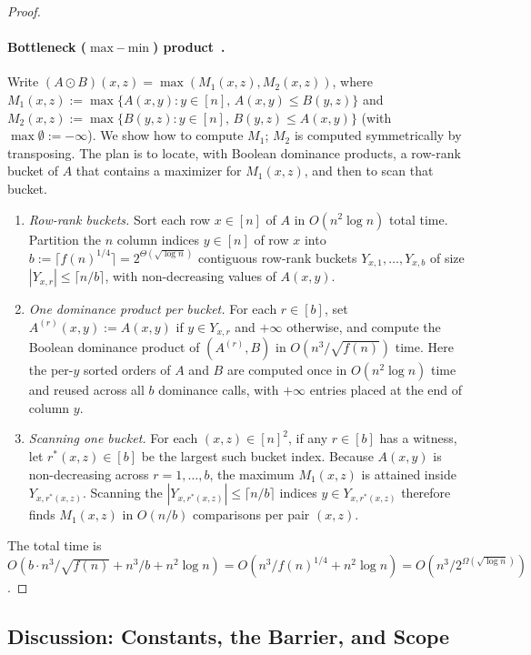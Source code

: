 \documentclass[11pt]{article}
\theoremstyle{definition}
\renewcommand{\label}[1]{}%
\newcommand{\abs}[1]{\left\lvert #1 \right\rvert}
\begin{document}
\begin{proof}
\paragraph{Bottleneck ($\max$--$\min$) product~\cite{VassilevskaWY07}.}
Write $(A \odot B)(x, z) = \max(M_1(x, z), M_2(x, z))$, where $M_1(x, z) := \max\{A(x, y) : y \in [n], \, A(x, y) \le B(y, z)\}$ and $M_2(x, z) := \max\{B(y, z) : y \in [n], \, B(y, z) \le A(x, y)\}$ (with $\max\emptyset := -\infty$). We show how to compute $M_1$; $M_2$ is computed symmetrically by transposing. The plan is to locate, with Boolean dominance products, a row-rank bucket of $A$ that contains a maximizer for $M_1(x, z)$, and then to scan that bucket.
\begin{enumerate}[label=(\roman*), leftmargin=*]
    \item \emph{Row-rank buckets.} Sort each row $x \in [n]$ of $A$ in $O(n^2\log n)$ total time. Partition the $n$ column indices $y \in [n]$ of row $x$ into $b := \lceil f(n)^{1/4} \rceil = 2^{\Theta(\sqrt{\log n})}$ contiguous row-rank buckets $Y_{x, 1}, \dots, Y_{x, b}$ of size $\abs{Y_{x, r}} \le \lceil n / b \rceil$, with non-decreasing values of $A(x, y)$.
    \item \emph{One dominance product per bucket.} For each $r \in [b]$, set $A^{(r)}(x, y) := A(x, y)$ if $y \in Y_{x, r}$ and $+\infty$ otherwise, and compute the Boolean dominance product of $(A^{(r)}, B)$ in $O(n^3 / \sqrt{f(n)})$ time. Here the per-$y$ sorted orders of $A$ and $B$ are computed once in $O(n^2\log n)$ time and reused across all $b$ dominance calls, with $+\infty$ entries placed at the end of column $y$.
    \item \emph{Scanning one bucket.} For each $(x, z) \in [n]^2$, if any $r \in [b]$ has a witness, let $r^*(x, z) \in [b]$ be the largest such bucket index. Because $A(x, y)$ is non-decreasing across $r = 1, \dots, b$, the maximum $M_1(x, z)$ is attained inside $Y_{x, r^*(x, z)}$. Scanning the $\abs{Y_{x, r^*(x, z)}} \le \lceil n / b \rceil$ indices $y \in Y_{x, r^*(x, z)}$ therefore finds $M_1(x, z)$ in $O(n/b)$ comparisons per pair $(x, z)$.
\end{enumerate}
The total time is $O(b \cdot n^3 / \sqrt{f(n)} + n^3 / b + n^2\log n) = O(n^3 / f(n)^{1/4} + n^2\log n) = O(n^3 / 2^{\Omega(\sqrt{\log n})})$.
\end{proof}

\subsection{Discussion: Constants, the Barrier, and Scope}
\label{sec:discussion}
\end{document}

